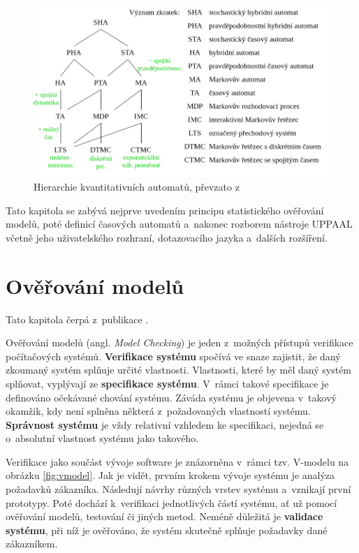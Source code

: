 \begin{figure}[H]
    \centering
    \includegraphics[width=\textwidth]{obrazky-figures/automata_zoo.png}
    \caption{Hierarchie kvantitativních automatů, převzato z~\cite{automata_zoo}}
    \label{fig:automata_zoo}
\end{figure}

Tato kapitola se zabývá nejprve uvedením principu statistického ověřování modelů, poté definicí časových automatů a~nakonec rozborem nástroje UPPAAL včetně jeho uživatelského rozhraní, dotazovacího jazyka a~dalších rozšíření.

\pagebreak

\section{Ověřování modelů}
Tato kapitola čerpá z~publikace \cite{mc_principles}.

Ověřování modelů (angl. \textit{Model Checking}) je jeden z~možných přístupů verifikace počítačových systémů. \textbf{Verifikace systému} spočívá ve snaze zajistit, že daný zkoumaný systém splňuje určité vlastnosti. Vlastnosti, které by měl daný systém splňovat, vyplývají ze \textbf{specifikace systému}. V~rámci takové specifikace je definováno očekávané chování systému. Záváda systému je objevena v~takový okamžik, kdy není splněna některá z~požadovaných vlastností systému. \textbf{Správnost systému} je vždy relativní vzhledem ke specifikaci, nejedná se o~absolutní vlastnost systému jako takového.

Verifikace jako součást vývoje software je znázorněna v~rámci tzv. V-modelu na obrázku \ref{fig:vmodel}. Jak je vidět, prvním krokem vývoje systému je analýza požadavků zákazníka. Následují návrhy různých vrstev systému a~vznikají první prototypy. Poté dochází k~verifikaci jednotlivých částí systému, ať už pomocí ověřování modelů, testování či jiných metod. Neméně důležitá je \textbf{validace systému}, při níž je ověřováno, že systém skutečně splňuje požadavky dané zákazníkem.

